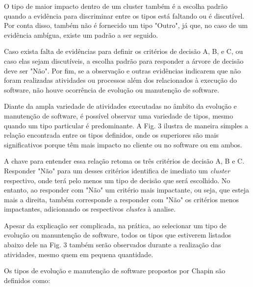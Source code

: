 O tipo de maior impacto dentro de um cluster também é a escolha padrão quando a evidência para 
discriminar entre os tipos está faltando ou é discutível. Por conta disso, também não é fornecido 
um tipo "Outro", já que, no caso de um evidência ambígua, existe um padrão a ser seguido.

Caso exista falta de evidências para definir os critérios de decisão A, B, e C, ou caso elas sejam 
discutíveis, a escolha padrão para responder a árvore de decisão deve ser "Não". Por fim, se a 
observação e outras evidências indicarem que não foram realizadas atividades ou processos além 
dos relacionados à execução do software, não houve ocorrência de evolução ou manutenção de software.


Diante da ampla variedade de atividades executadas no âmbito da evolução e manutenção de software, 
é possível observar uma variedade de tipos, mesmo quando um tipo particular é predominante. A Fig. 3 
ilustra de maneira simples a relação encontrada entre os tipos definidos, onde os superiores são mais 
significativos porque têm mais impacto no cliente ou no software ou em ambos.

A chave para entender essa relação retoma os três critérios de decisão A, B e C. Responder 
"Não" para um desses critérios identifica de imediato um \textit{cluster} respectivo, onde terá 
pelo menos um tipo de decisão que será escolhido. No entanto, ao responder com "Não" um critério 
mais impactante, ou seja, que esteja mais a direita, também corresponde a responder com "Não" os 
critérios menos impactantes, adicionando os respectivos \textit{clustes} à analise. 

Apesar da explicação ser complicada, na prática, ao selecionar um tipo de evolução ou manuntenção 
de software, todos os tipos que estiverem listados abaixo dele na Fig. 3 também serão observados 
durante a realização das atividades, mesmo quem em pequena quantidade.


Os tipos de evolução e manutenção de software propostos por Chapin são definidos como:

